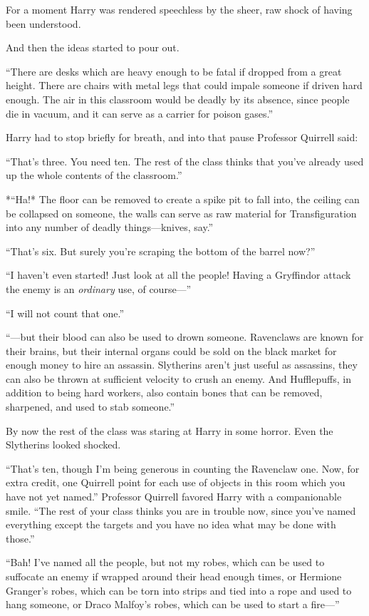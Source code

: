 For a moment Harry was rendered speechless by the sheer, raw shock of
having been understood.

And then the ideas started to pour out.

``There are desks which are heavy enough to be fatal if dropped from a
great height. There are chairs with metal legs that could impale someone
if driven hard enough. The air in this classroom would be deadly by its
absence, since people die in vacuum, and it can serve as a carrier for
poison gases.''

Harry had to stop briefly for breath, and into that pause Professor
Quirrell said:

``That's three. You need ten. The rest of the class thinks that you've
already used up the whole contents of the classroom.''

*``Ha!* The floor can be removed to create a spike pit to fall into, the
ceiling can be collapsed on someone, the walls can serve as raw material
for Transfiguration into any number of deadly things---knives, say.''

``That's six. But surely you're scraping the bottom of the barrel now?''

``I haven't even started! Just look at all the people! Having a
Gryffindor attack the enemy is an \emph{ordinary} use, of course---''

``I will not count that one.''

``---but their blood can also be used to drown someone. Ravenclaws are
known for their brains, but their internal organs could be sold on the
black market for enough money to hire an assassin. Slytherins aren't
just useful as assassins, they can also be thrown at sufficient velocity
to crush an enemy. And Hufflepuffs, in addition to being hard workers,
also contain bones that can be removed, sharpened, and used to stab
someone.''

By now the rest of the class was staring at Harry in some horror. Even
the Slytherins looked shocked.

``That's ten, though I'm being generous in counting the Ravenclaw one.
Now, for extra credit, one Quirrell point for each use of objects in
this room which you have not yet named.'' Professor Quirrell favored
Harry with a companionable smile. ``The rest of your class thinks you
are in trouble now, since you've named everything except the targets and
you have no idea what may be done with those.''

``Bah! I've named all the people, but not my robes, which can be used to
suffocate an enemy if wrapped around their head enough times, or
Hermione Granger's robes, which can be torn into strips and tied into a
rope and used to hang someone, or Draco Malfoy's robes, which can be
used to start a fire---''

